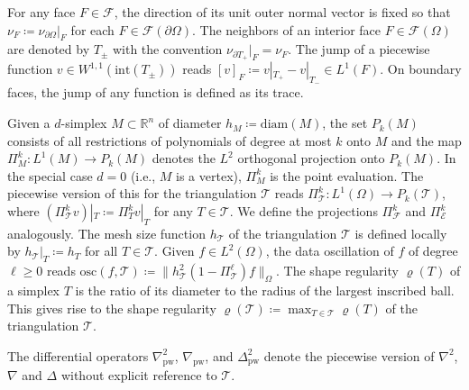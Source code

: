 \documentclass[a4paper]{amsart}
\numberwithin{equation}{section}
\def\R{\mathbb{R}}
\def\T{\mathcal{T}}
\def\pw{\mathrm{pw}}
\theoremstyle{definition}
\theoremstyle{remark}
\numberwithin{theorem}{section}
\numberwithin{equation}{section}
\numberwithin{table}{section}
\numberwithin{figure}{section}
\begin{document}
For any face $F \in \mathcal{F}$, the direction of its unit outer normal vector is fixed so that $\nu_F \coloneqq \nu_{\partial \Omega}|_F$ for each $F\in\mathcal{F}(\partial \Omega)$. The neighbors of an interior face $F \in \mathcal{F}(\Omega)$ are denoted by $T_\pm$ with the convention $\nu_{\partial T_+}|_F = \nu_F$. The jump of a piecewise function $v \in W^{1,1}(\mathrm{int}(T_\pm))$ reads $[v]_F \coloneqq v|_{T_+} - v|_{T_-} \in L^1(F)$. On boundary faces, the jump of any function is defined as its trace.

Given a $d$-simplex $M \subset \R^n$ of diameter $h_M \coloneqq \mathrm{diam}(M)$, the set $P_k(M)$ consists of all restrictions of polynomials of degree at most $k$ onto $M$ and the map $\Pi_M^k : L^1(M) \to P_k(M)$ denotes the $L^2$ orthogonal projection onto $P_k(M)$. In the special case $d = 0$ (i.e., $M$ is a vertex), $\Pi_M^k$ is the point evaluation.
The piecewise version of this for the triangulation $\mathcal{T}$ reads $\Pi_\mathcal{T}^k : L^1(\Omega) \to P_k(\mathcal{T})$, where $(\Pi_\mathcal{T}^k v)|_T \coloneqq \Pi_T^k v|_T$ for any $T \in \mathcal{T}$.
We define the projections $\Pi_\mathcal{F}^k$ and $\Pi_\mathcal{E}^k$ analogously.
The mesh size function $h_\mathcal{T}$ of the triangulation $\mathcal{T}$ is defined locally by $h_\mathcal{\mathcal{T}}|_T \coloneqq h_T$ for all $T \in \T$.
Given $f \in L^2(\Omega)$, the data oscillation of $f$ of degree $\ell \geq 0$ reads $\mathrm{osc}(f,\mathcal{T}) \coloneqq \|h_\mathcal{T}^2(1 - \Pi_\mathcal{T}^\ell) f\|_\Omega$.
The shape regularity $\varrho(T)$ of a simplex $T$ is the ratio of its diameter to the radius of the largest inscribed ball. This gives rise to the shape regularity $\varrho(\mathcal{T}) \coloneqq \max_{T \in \mathcal{T}} \varrho(T)$ of the triangulation $\mathcal{T}$.

The differential operators $\nabla^2_\pw$, $\nabla_\pw$, and $\Delta^2_\pw$ denote the piecewise
version of $\nabla^2$, $\nabla$ and $\Delta$ without explicit reference to $\T$.
\end{document}
